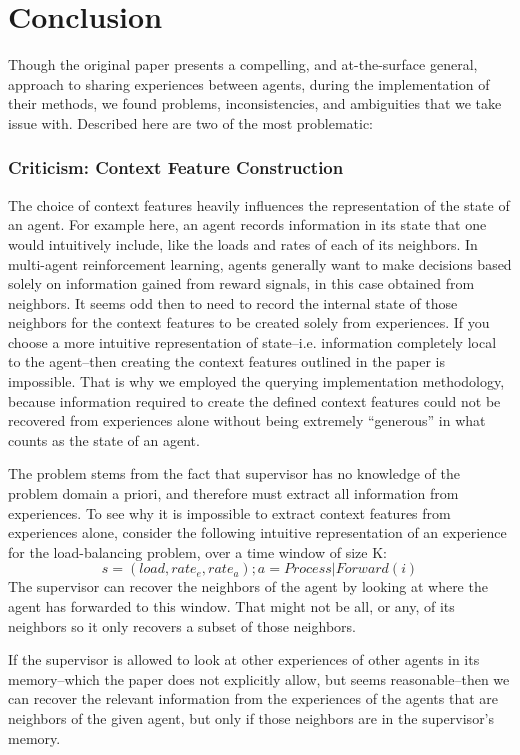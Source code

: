\documentclass[letterpaper]{article}
\begin{document}
\section{Conclusion}
Though the original paper presents a compelling, and at-the-surface general, approach to sharing experiences between agents, during the implementation of their methods, we found problems, inconsistencies, and ambiguities that we take issue with.  Described here are two of the most problematic:
\subsubsection{Criticism: Context Feature Construction}
The choice of context features heavily influences the representation of the state of an agent.  For example here, an agent records information in its state that one would intuitively include, like the loads and rates of each of its neighbors.  In multi-agent reinforcement learning, agents generally want to make decisions based solely on information gained from reward signals, in this case obtained from neighbors.  It seems odd then to need to record the internal state of those neighbors for the context features to be created solely from experiences.  If you choose a more intuitive representation of state--i.e. information completely local to the agent--then creating the context features outlined in the paper is impossible. That is why we employed the querying implementation methodology, because information required to create the defined context features could not be recovered from experiences alone without being extremely “generous” in what counts as the state of an agent.

The problem stems from the fact that supervisor has no knowledge of the problem domain a priori, and therefore must extract all information from experiences. To see why it is impossible to extract context features from experiences alone, consider the following intuitive representation of an experience for the load-balancing problem, over a time window of size K:
$$ s = (load, rate_e, rate_a); a = Process | Forward(i) $$
The supervisor can recover the neighbors of the agent by looking at where the agent has forwarded to this window.  That might not be all, or any, of its neighbors so it only recovers a subset of those neighbors.

If the supervisor is allowed to look at other experiences of other agents in its memory--which the paper does not explicitly allow, but seems reasonable--then we can recover the relevant information from the experiences of the agents that are neighbors of the given agent, but only if those neighbors are in the supervisor’s memory.
\end{document}
